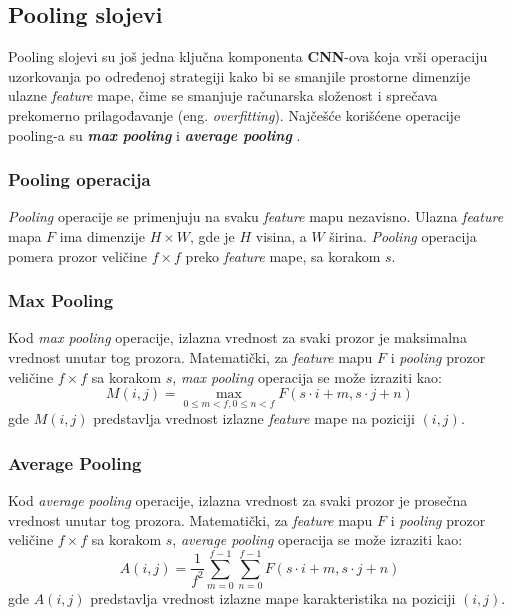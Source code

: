 \documentclass[12pt]{article}
\begin{document}
    \newpage 
    
    \subsection*{Pooling slojevi}
   Pooling slojevi su još jedna ključna komponenta \textbf{CNN}-ova koja vrši operaciju uzorkovanja po određenoj strategiji kako bi 
   se smanjile prostorne dimenzije ulazne \textit{feature} mape, čime se smanjuje 
   računarska složenost i sprečava prekomerno prilagođavanje (eng. \textit{overfitting}). 
   Najčešće korišćene operacije pooling-a su \textbf{\textit{max pooling}} i \textbf{\textit{average pooling}} \cite{pooling}.
   \subsubsection*{Pooling operacija}
   \textit{Pooling} operacije se primenjuju na svaku \textit{feature} mapu nezavisno. 
   Ulazna \textit{feature} mapa \( F \) ima dimenzije \( H \times W \), gde je \( H \) visina, 
   a \( W \) širina. \textit{Pooling} operacija pomera prozor veličine \( f \times f \) preko \textit{feature} mape,
   sa korakom \( s \).
   \subsubsection*{Max Pooling}
   \vspace{-0.3cm}
   Kod \textit{max pooling} operacije, izlazna vrednost za svaki prozor je maksimalna vrednost 
   unutar tog prozora. Matematički, za \textit{feature} mapu \( F \) i \textit{pooling} prozor 
   veličine \( f \times f \) sa korakom \( s \), 
   \textit{max pooling} operacija se može izraziti kao:
   \[
   M(i, j) = \max_{0 \leq m < f, 0 \leq n < f} F(s \cdot i + m, s \cdot j + n)
   \]
   gde \( M(i, j) \) predstavlja vrednost izlazne \textit{feature} mape na poziciji \((i, j)\).
   \subsubsection*{Average Pooling}
   \vspace{-0.3cm}
   Kod \textit{average pooling} operacije, izlazna vrednost za svaki prozor je prosečna vrednost unutar tog 
   prozora. Matematički, za \textit{feature} mapu \( F \) i \textit{pooling} prozor veličine 
   \( f \times f \) sa korakom \( s \), 
   \textit{average pooling} operacija se može izraziti kao:
   \[
   A(i, j) = \frac{1}{f^2} \sum_{m=0}^{f-1} \sum_{n=0}^{f-1} F(s \cdot i + m, s \cdot j + n)
   \]
   gde \( A(i, j) \) predstavlja vrednost izlazne mape karakteristika na poziciji \((i, j)\).
\end{document}
